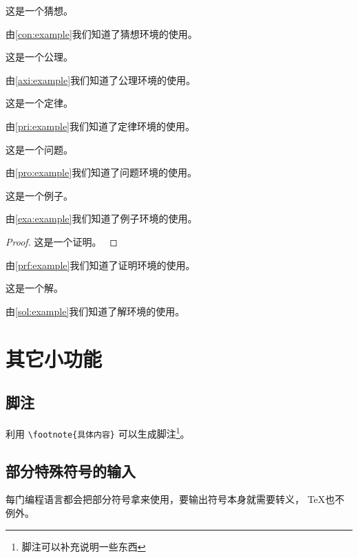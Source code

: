 \documentclass[withoutpreface,bwprint]{cumcmthesis} %
\numberwithin{equation}{subsection}
\begin{document}
\begin{conjecture}
    这是一个猜想。
    \label{con:example}
\end{conjecture}
由\cref{con:example}我们知道了猜想环境的使用。

\begin{axiom}
    这是一个公理。
    \label{axi:example}
\end{axiom}
由\cref{axi:example}我们知道了公理环境的使用。

\begin{principle}
    这是一个定律。
    \label{pri:example}
\end{principle}
由\cref{pri:example}我们知道了定律环境的使用。

\begin{problem}
    这是一个问题。
    \label{pro:example}
\end{problem}
由\cref{pro:example}我们知道了问题环境的使用。

\begin{example}
    这是一个例子。
    \label{exa:example}
\end{example}
由\cref{exa:example}我们知道了例子环境的使用。

\begin{proof}
    这是一个证明。
    \label{prf:example}
\end{proof}
由\cref{prf:example}我们知道了证明环境的使用。

\begin{solution}
    这是一个解。
    \label{sol:example}
\end{solution}
由\cref{sol:example}我们知道了解环境的使用。



\section{其它小功能}
\subsection{脚注}

利用 \verb|\footnote{具体内容}| 可以生成脚注\footnote{脚注可以补充说明一些东西}。

\subsection{部分特殊符号的输入}

每门编程语言都会把部分符号拿来使用，要输出符号本身就需要转义， \TeX{}也不例外。
\end{document}
